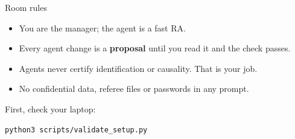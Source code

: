 \begin{frame}[fragile]{Room rules}
  \begin{itemize}
    \item You are the manager; the agent is a fast RA.
    \item Every agent change is a \textbf{proposal} until you read it and the check passes.
    \item Agents never certify identification or causality. That is your job.
    \item No confidential data, referee files or passwords in any prompt.
  \end{itemize}
  \vspace{0.3em}
  First, check your laptop:
  \begin{lstlisting}[style=bash]
python3 scripts/validate_setup.py
  \end{lstlisting}
\end{frame}







